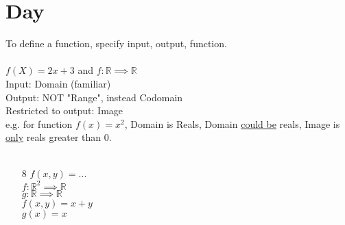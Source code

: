 \documentclass{article}
\begin{document}
	\section{Day }
	To define a function, specify input, output, function.\\
	\\
	$f(X) = 2x+3$ and $f:\mathbb{R} \implies \mathbb{R}$\\
	Input: Domain (familiar)\\
	Output: NOT "Range", instead Codomain\\
	Restricted to output: Image\\
	e.g. for function $f(x)=x^2$, Domain is Reals, Domain \underline{could be} reals, Image is \underline{only} reals greater than 0.\\
	\\
	\begin{enumerate}
		\item[8]
			$f(x,y)= ...$\\
			$f:\mathbb{R}^2 \implies \mathbb{R}$\\
			$g:\mathbb{R} \implies \mathbb{R}$\\
			$f(x,y) = x+y$\\
			$g(x) = x$
	\end{enumerate}
\end{document}
